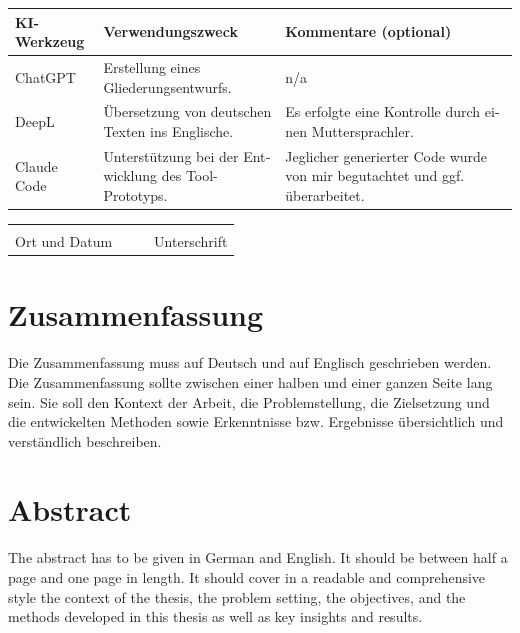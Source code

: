 \documentclass[
    pdftex,
    final,
    11pt,
    a4paper,
    parskip=false, %
    twoside, %
    footheight=0mm, %
    footinclude=false,
    toc=bibliography, %
    toc=listof %
]{scrbook} %
\begin{document}
\begin{otherlanguage}{ngerman}
\begin{center}
\small
\begin{tabularx}{\linewidth}{|l|X|X|}
\hline
\textbf{KI-Werkzeug} & \textbf{Verwendungszweck} & \textbf{Kommentare (optional)} \\
\hline
ChatGPT & Erstellung eines Gliederungsentwurfs. & n/a \\
\hline
DeepL & Übersetzung von deutschen Texten ins Englische. & Es erfolgte eine Kontrolle durch einen Muttersprachler. \\ \hline
Claude Code & Unterstützung bei der Entwicklung des Tool-Prototyps. & Jeglicher generierter Code wurde von mir begutachtet und ggf. überarbeitet. \\
\hline
\end{tabularx} 
\end{center}

\vspace{2cm}
	
\noindent\begin{tabularx}{\textwidth}{XXXX}
	&&& \\
	\cline{1-1}\cline{4-4}\footnotesize\centering Ort und Datum		&&& \footnotesize\centering Unterschrift
\end{tabularx}
	
\newpage

\chapter*{Zusammenfassung}

Die Zusammenfassung muss auf Deutsch und auf Englisch geschrieben werden. Die Zusammenfassung sollte zwischen einer halben und einer ganzen Seite lang sein. Sie soll den
Kontext der Arbeit, die Problemstellung, die Zielsetzung und die entwickelten Methoden
sowie Erkenntnisse bzw. Ergebnisse übersichtlich und verständlich beschreiben.

\end{otherlanguage}

\chapter*{Abstract}

The abstract has to be given in German and English. It should be between half a
page and one page in length. It should cover in a readable and comprehensive style the
context of the thesis, the problem setting, the objectives, and the methods developed in
this thesis as well as key insights and results.
\end{document}
